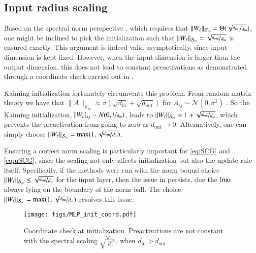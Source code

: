\subsection{Input radius scaling}\label{app:input-radius}

Based on the spectral norm perspective \citep{yang2023spectral}, which requires that $\|W_\ell\|_{\mathcal{S}_\infty}=\Theta (\sqrt{\nicefrac{d_\mathrm{out}}{d_\mathrm{in}}})$, one might be inclined to pick the initialization such that $\|W_\ell\|_{\mathcal{S}_\infty}=\sqrt{\nicefrac{d_\mathrm{out}}{d_\mathrm{in}}}$ is ensured exactly.
This argument is indeed valid asymptotically, since input dimension is kept fixed.
However, when the input dimension is larger than the output dimension, this does not lead to constant preactivations as demonstrated through a coordinate check \citep{yang2021tensor} carried out in .

Kaiming initialization \citep{he2015delving} fortunately circumvents this problem.
From random matrix theory we have that $\|A\|_{\mathcal{S}_\infty}\approx \sigma (\sqrt{d_\mathrm{in}} + \sqrt{d_\mathrm{out}})$ for $A_{ij} \sim \mathcal N(0,\sigma^2)$ \citep{vershynin2018high}.
So the Kaiming initialization, $[W_\ell]_{ij} \sim N(0,\nicefrac{1}{d_\mathrm{in}})$, leads to $\|W_\ell\|_{\mathcal{S}_\infty}\approx 1 + \sqrt{\nicefrac{d_\mathrm{out}}{d_\mathrm{in}}}$, which prevents the preactivation from going to zero as $d_\mathrm{out} \rightarrow 0$.
Alternatively, one can simply choose $\|W_\ell\|_{\mathcal{S}_\infty}=\max(1,\sqrt{\nicefrac{d_\mathrm{out}}{d_\mathrm{in}}})$.

Ensuring a correct norm scaling is particularly important for \ref{eq:SCG} and \ref{eq:uSCG}, since the scaling not only affects initialization but also the update rule itself.
Specifically, if the methods were run with the norm bound choice $\|W_\ell\|_{\mathcal{S}_\infty}\leq \sqrt{\nicefrac{d_\mathrm{out}}{d_\mathrm{in}}}$ for the input layer, then the issue in  persists, due the $\operatorname{lmo}$ always lying on the boundary of the norm ball.
The choice $\|W_\ell\|_{\mathcal{S}_\infty}=\max(1,\sqrt{\nicefrac{d_\mathrm{out}}{d_\mathrm{in}}})$ resolves this issue.

\begin{figure}
\centering
\texttt{[image: figs/MLP\_init\_coord.pdf]}
\caption{Coordinate check at initialization. Preactivations are not constant with the spectral scaling $\sqrt{\tfrac{d_\mathrm{out}}{d_\mathrm{in}}}$, when $d_\mathrm{in}>d_\mathrm{out}$.}
\label{fig:init:coordinate-check}
\end{figure}


